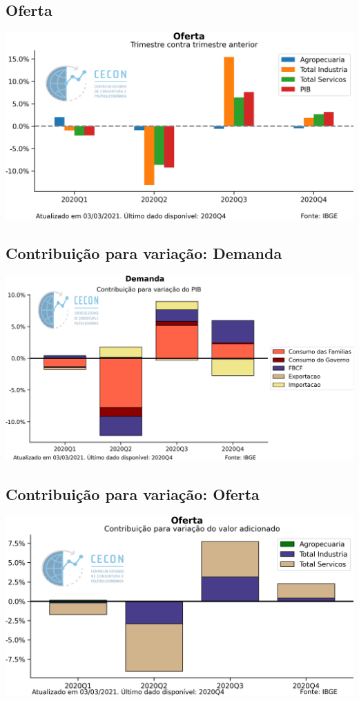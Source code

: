 \documentclass{SelfArx}
\begin{document}
\subsection*{Oferta}
\label{sec:org3dc6057}


\begin{center}
\includegraphics[width=.9\linewidth]{./figs/PIB/Oferta.png}
\end{center}


\subsection*{Contribuição para variação: Demanda}
\label{sec:org49f1049}

\begin{center}
\includegraphics[width=.9\linewidth]{./figs/PIB/Contrib_Demanda.png}
\end{center}

\subsection*{Contribuição para variação: Oferta}
\label{sec:org77b0a0e}

\begin{center}
\includegraphics[width=.9\linewidth]{./figs/PIB/Contrib_Oferta.png}
\end{center}
\end{document}
